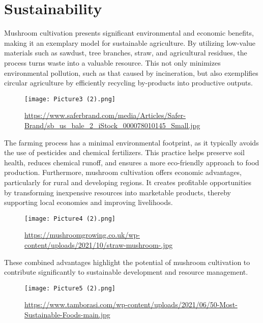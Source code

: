 \section{Sustainability}
Mushroom cultivation presents significant environmental and economic benefits, making it an exemplary model for sustainable agriculture. By utilizing low-value materials such as sawdust, tree branches, straw, and agricultural residues, the process turns waste into a valuable resource. This not only minimizes environmental pollution, such as that caused by incineration, but also exemplifies circular agriculture by efficiently recycling by-products into productive outputs.\\
\begin{figure}[htbp]
    \centering
    \texttt{[image: Picture3 (2).png]}
    \caption{\url{https://www.saferbrand.com/media/Articles/Safer-Brand/sb_us_bale_2_iStock_000078010145_Small.jpg}}
\end{figure}\newpage
The farming process has a minimal environmental footprint, as it typically avoids the use of pesticides and chemical fertilizers. This practice helps preserve soil health, reduces chemical runoff, and ensures a more eco-friendly approach to food production. Furthermore, mushroom cultivation offers economic advantages, particularly for rural and developing regions. It creates profitable opportunities by transforming inexpensive resources into marketable products, thereby supporting local economies and improving livelihoods.\\
\begin{figure}[htbp]
    \centering
    \texttt{[image: Picture4 (2).png]}
    \caption{\url{https://mushroomgrowing.co.uk/wp-content/uploads/2021/10/straw-mushroom-.jpg}}
\end{figure}\par
These combined advantages highlight the potential of mushroom cultivation to contribute significantly to sustainable development and resource management.\\
\begin{figure}[htbp]
    \centering
    \texttt{[image: Picture5 (2).png]}
    \caption{\url{https://www.tamborasi.com/wp-content/uploads/2021/06/50-Most-Sustainable-Foods-main.jpg}}
\end{figure}\par